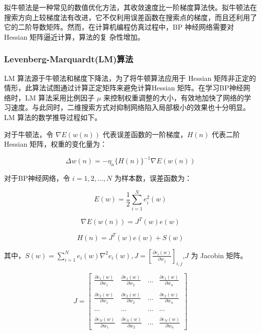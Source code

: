 \documentclass[UTF8]{ctexart}
\begin{document}
拟牛顿法是一种常见的数值优化方法，其收敛速度比一阶梯度算法快。拟牛顿法在搜索方向上较梯度法有改进，它不仅利用误差函数在搜索点的梯度，而且还利用了它的二阶导数矩阵。然而，在计算机编程仿真过程中，BP 神经网络需要对 Hessian 矩阵逼近计算，算法的复
杂性增加。

\subsubsection{Levenberg-Marquardt(LM)算法}

LM 算法源于牛顿法和梯度下降法，为了将牛顿算法应用于 Hessian 矩阵非正定的情形，此算法试图通过计算正定矩阵来避免计算Hessian 矩阵。在学习BP神经网络时，LM 算法采用比例因子 $\mu$ 来控制权重调整的大小，有效地加快了网络的学习速度。与此同时，二维搜索方式对抑制网络陷入局部极小的效果也十分明显。LM 算法的数学推导过程如下。 \par

对于牛顿法，令 $\nabla E(w(n))$ 代表误差函数的一阶梯度，$H(n)$ 代表二阶 Hessian 矩阵，权重的变化量为：

\begin{equation}
\Delta w(n) = - \eta_n \{ H(n) \}^{-1} \nabla E(w(n))
\end{equation}

对于BP神经网络，令 $i = 1,2,...,N$ 为样本数，误差函数为：

\begin{equation}
E(w) = \frac{1}{2} \sum_{i=1}^{N} e_{i}^{2} (w)
\end{equation}

\begin{equation}
\nabla E(w(n)) = J^T(w)e(w)
\end{equation}

\begin{equation}
H(n) = J^T(w)e(w) + S(w)
\end{equation}

其中，$S(w)=\sum_{i=1}^{N} e_i(w) \nabla^2 e_i(w), J = [\frac{\partial e_i(w)}{\partial w_j}]_{i,j}$,$J$ 为 Jacobin 矩阵。 \par

\begin{equation}
J = \begin{bmatrix}
\frac{\partial e_1(w)}{\partial w_1} & \frac{\partial e_1(w)}{\partial w_2} & ... & \frac{\partial e_1(w)}{\partial w_n} \\\\
\frac{\partial e_2(w)}{\partial w_1} & \frac{\partial e_2(w)}{\partial w_2} & ... & \frac{\partial e_2(w)}{\partial w_n} \\\\
... & ... & ... & ... \\\\
\frac{\partial e_N(w)}{\partial w_1} & \frac{\partial e_N(w)}{\partial w_2} & ... & \frac{\partial e_N(w)}{\partial w_n}
\end{bmatrix}
\end{equation}
\end{document}
